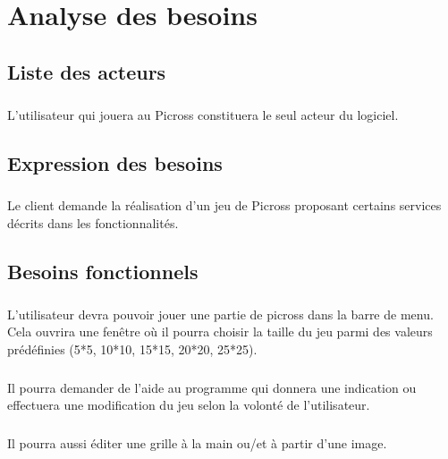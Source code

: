 \chapter{Analyse des besoins} 


\section{Liste des acteurs}
        \paragraph*{}
        L'utilisateur qui jouera au Picross constituera le seul acteur du logiciel.


\section{Expression des besoins}
        \paragraph*{}
        Le client demande la réalisation d'un jeu de Picross proposant certains services décrits dans les fonctionnalités. 



\section{Besoins fonctionnels}
        \paragraph*{}
        L'utilisateur devra pouvoir jouer une partie de picross dans la barre de menu. Cela ouvrira une fenêtre où il pourra choisir la taille du jeu  parmi des valeurs prédéfinies (5*5, 10*10, 15*15, 20*20, 25*25). 
        \paragraph*{}
        Il pourra demander de l'aide au programme qui donnera une indication ou effectuera une modification du jeu selon la volonté de l'utilisateur.
        \paragraph*{}
        Il pourra aussi éditer une grille à la main ou/et à partir d'une image.
